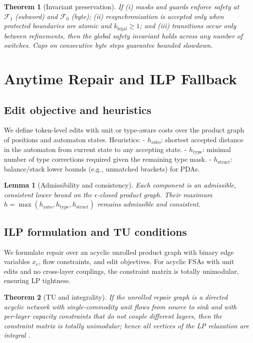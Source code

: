 \documentclass{article}
\newtheorem{lemma}{Lemma}
\newtheorem{theorem}{Theorem}
\begin{document}
\begin{theorem}[Invariant preservation]\label{thm:mf}
If (i) masks and guards enforce safety at $\mathcal{F}_1$ (subword) and $\mathcal{F}_0$ (byte); (ii) resynchronization is accepted only when protected boundaries are atomic and $k_{\mathrm{legal}}\ge 1$; and (iii) transitions occur only between refinements, then the global safety invariant holds across any number of switches. Caps on consecutive byte steps guarantee bounded slowdown.
\end{theorem}

\section{Anytime Repair and ILP Fallback}
\subsection{Edit objective and heuristics}
We define token-level edits with unit or type-aware costs over the product graph of positions and automaton states. Heuristics:
- $h_{\mathrm{auto}}$: shortest accepted distance in the automaton from current state to any accepting state.
- $h_{\mathrm{type}}$: minimal number of type corrections required given the remaining type mask.
- $h_{\mathrm{struct}}$: balance/stack lower bounds (e.g., unmatched brackets) for PDAs.

\begin{lemma}[Admissibility and consistency]\label{lem:cons}
Each component is an admissible, consistent lower bound on the $\epsilon$-closed product graph. Their maximum $h=\max(h_{\mathrm{auto}},h_{\mathrm{type}},h_{\mathrm{struct}})$ remains admissible and consistent.
\end{lemma}

\subsection{ILP formulation and TU conditions}
We formulate repair over an acyclic unrolled product graph with binary edge variables $x_e$, flow constraints, and edit objectives. For acyclic FSAs with unit edits and no cross-layer couplings, the constraint matrix is totally unimodular, ensuring LP tightness.

\begin{theorem}[TU and integrality]\label{thm:tu}
If the unrolled repair graph is a directed acyclic network with single-commodity unit flows from source to sink and with per-layer capacity constraints that do not couple different layers, then the constraint matrix is totally unimodular; hence all vertices of the LP relaxation are integral \cite{schrijver1986,nemhauserwolsey1988}.
\end{theorem}
\end{document}
